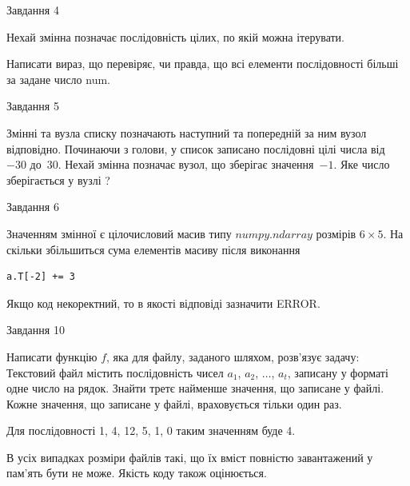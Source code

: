 \documentclass[12pt, ukrainian]{article}
\begin{document}
{               
{\begin{center}Завдання {4}\end{center}}
\vspace{-6mm}
Нехай змінна  позначає послідовність цілих, по якій можна ітерувати.

Написати вираз, що перевіряє, чи правда, що всі елементи послідовності більші за задане число num.\par

\vspace{10mm}
               
{\begin{center}Завдання {5}\end{center}}
\vspace{-6mm}
Змінні  та  вузла списку позначають наступний та попередній за ним вузол відповідно. Починаючи з голови, у список записано послідовні цілі числа від~$-30$ до~$30$. Нехай змінна  позначає вузол, що зберігає значення~$-1$.
Яке число зберігається у вузлі  ?\par

               
{\begin{center}Завдання {6}\end{center}}
\vspace{-6mm}
Значенням змінної  є цілочисловий масив типу $numpy.ndarray$ розмірів $6{\times}5$. На скільки збільшиться сума елементів масиву  після виконання
\begin{verbatim}
a.T[-2] += 3
\end{verbatim}


Якщо код некоректний, то в якості відповіді зазначити ERROR.\par

               
{\begin{center}Завдання {10}\end{center}}
\vspace{-6mm}

Написати функцію $f$, яка для файлу, заданого шляхом, розв’язує задачу:\\ Текстовий файл містить послідовність чисел $a_1$, $a_2$, $\ldots$, $a_t$, записану у форматі одне число на рядок. Знайти третє найменше значення, що записане у файлі. Кожне значення, що записане у файлі, враховується тільки один раз. \par
Для послідовності 1, 4, 12, 5, 1, 0 таким значенням буде 4.

В усіх випадках розміри файлів такі, що їх вміст повністю завантажений у пам'ять бути не може. Якість коду також оцінюється.



}
\end{document}
